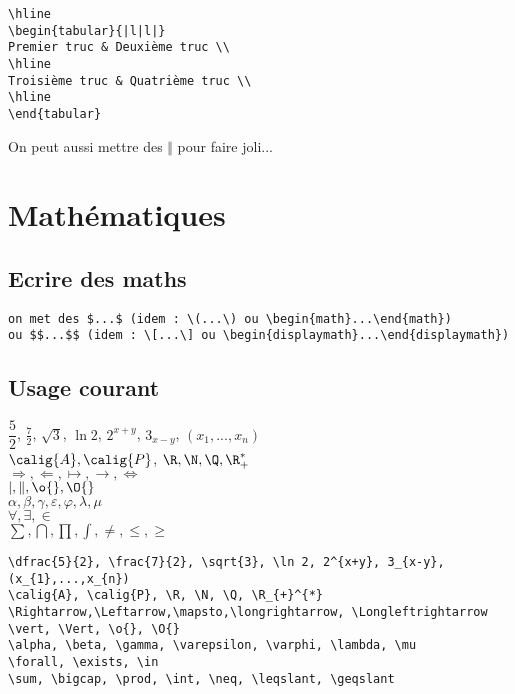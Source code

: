 \documentclass[12pt,french,oneside]{report}
\begin{document}
\begin{spacing}{1.2}
\begin{verbatim}
\hline
\begin{tabular}{|l|l|}
Premier truc & Deuxième truc \\
\hline
Troisième truc & Quatrième truc \\
\hline
\end{tabular}
\end{verbatim}

On peut aussi mettre des $\Vert$ pour faire joli...

\section{Mathématiques}

\subsection{Ecrire des maths}

\begin{verbatim}
on met des $...$ (idem : \(...\) ou \begin{math}...\end{math})
ou $$...$$ (idem : \[...\] ou \begin{displaymath}...\end{displaymath})
\end{verbatim}

\subsection{Usage courant}

\begin{center}
$\dfrac{5}{2}$, $\frac{7}{2}$, $\sqrt{3}$, $\ln 2$, $2^{x+y}$, $3_{x-y}$, $(x_{1},...,x_{n})$\\
$\calig{A}, \calig{P}$, $\R, \N, \Q, \R_{+}^{*}$\\
$\Rightarrow,\Leftarrow,\mapsto,\longrightarrow, \Longleftrightarrow$\\
$\vert, \Vert, \o{}, \O{}$\\
$\alpha, \beta, \gamma, \varepsilon, \varphi, \lambda, \mu$\\
$\forall, \exists, \in$\\
$\sum, \bigcap, \prod, \int, \neq, \leqslant, \geqslant$\\
\end{center}

\begin{verbatim} 
\dfrac{5}{2}, \frac{7}{2}, \sqrt{3}, \ln 2, 2^{x+y}, 3_{x-y}, (x_{1},...,x_{n})
\calig{A}, \calig{P}, \R, \N, \Q, \R_{+}^{*}
\Rightarrow,\Leftarrow,\mapsto,\longrightarrow, \Longleftrightarrow
\vert, \Vert, \o{}, \O{}
\alpha, \beta, \gamma, \varepsilon, \varphi, \lambda, \mu
\forall, \exists, \in
\sum, \bigcap, \prod, \int, \neq, \leqslant, \geqslant
\end{verbatim}


\end{spacing}
\end{document}
